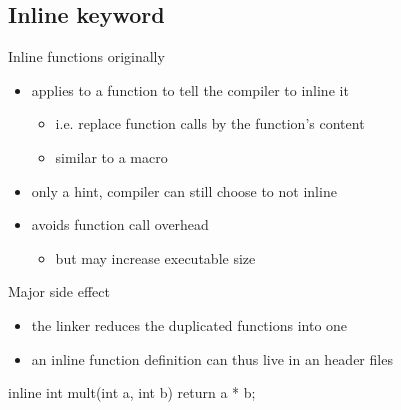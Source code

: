 \subsection[inline]{Inline keyword}

\begin{frame}[fragile]
  \begin{block}{Inline functions originally}
    \begin{itemize}
      \item applies to a function to tell the compiler to inline it
        \begin{itemize}
        \item i.e. replace function calls by the function's content
        \item similar to a macro
        \end{itemize}
      \item only a hint, compiler can still choose to not inline
      \item avoids function call overhead
        \begin{itemize}
        \item but may increase executable size
        \end{itemize}
    \end{itemize}
  \end{block}
  \begin{exampleblock}{Major side effect}
    \begin{itemize}
      \item the linker reduces the duplicated functions into one
      \item an inline function definition can thus live in an header files
    \end{itemize}
  \end{exampleblock}
  \begin{block}{}
    \begin{cppcode*}{}
      inline int mult(int a, int b) {
        return a * b;
      }
    \end{cppcode*}
  \end{block}
\end{frame}


